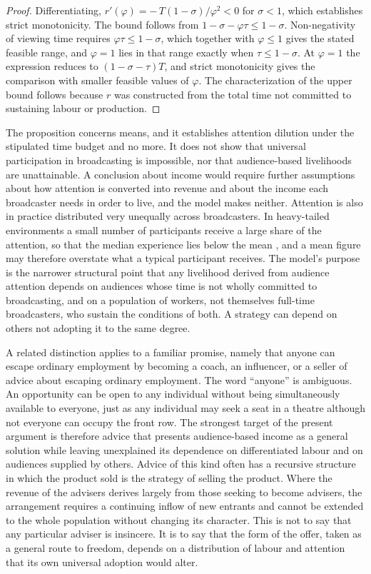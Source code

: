 \documentclass[11pt]{article}
\theoremstyle{definition}
\theoremstyle{remark}
\begin{document}
\begin{proof}
Differentiating, $r'(\varphi) = -\,T(1-\sigma)/\varphi^{2} < 0$ for $\sigma < 1$, which establishes strict monotonicity. The bound follows from $1 - \sigma - \varphi\tau \le 1 - \sigma$. Non-negativity of viewing time requires $\varphi\tau \le 1-\sigma$, which together with $\varphi \le 1$ gives the stated feasible range, and $\varphi = 1$ lies in that range exactly when $\tau \le 1 - \sigma$. At $\varphi = 1$ the expression reduces to $(1-\sigma-\tau)T$, and strict monotonicity gives the comparison with smaller feasible values of $\varphi$. The characterization of the upper bound follows because $r$ was constructed from the total time not committed to sustaining labour or production.
\end{proof}

The proposition concerns means, and it establishes attention dilution under the stipulated time budget and no more. It does not show that universal participation in broadcasting is impossible, nor that audience-based livelihoods are unattainable. A conclusion about income would require further assumptions about how attention is converted into revenue and about the income each broadcaster needs in order to live, and the model makes neither. Attention is also in practice distributed very unequally across broadcasters. In heavy-tailed environments a small number of participants receive a large share of the attention, so that the median experience lies below the mean \cite{rosen1981,frankcook1995}, and a mean figure may therefore overstate what a typical participant receives. The model's purpose is the narrower structural point that any livelihood derived from audience attention depends on audiences whose time is not wholly committed to broadcasting, and on a population of workers, not themselves full-time broadcasters, who sustain the conditions of both. A strategy can depend on others not adopting it to the same degree.

A related distinction applies to a familiar promise, namely that anyone can escape ordinary employment by becoming a coach, an influencer, or a seller of advice about escaping ordinary employment. The word ``anyone'' is ambiguous. An opportunity can be open to any individual without being simultaneously available to everyone, just as any individual may seek a seat in a theatre although not everyone can occupy the front row. The strongest target of the present argument is therefore advice that presents audience-based income as a general solution while leaving unexplained its dependence on differentiated labour and on audiences supplied by others. Advice of this kind often has a recursive structure in which the product sold is the strategy of selling the product. Where the revenue of the advisers derives largely from those seeking to become advisers, the arrangement requires a continuing inflow of new entrants and cannot be extended to the whole population without changing its character. This is not to say that any particular adviser is insincere. It is to say that the form of the offer, taken as a general route to freedom, depends on a distribution of labour and attention that its own universal adoption would alter.
\end{document}
